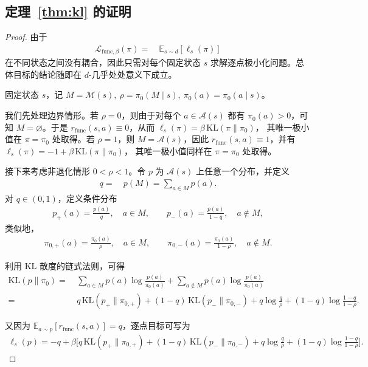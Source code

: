 \subsection{定理~\ref{thm:kl} 的证明}\label{sec:proof-kl-proj}

\begin{proof}
由于
\begin{align*}
\mathcal L_{\mathrm{func},\beta}(\pi)= &~ \mathbb E_{s\sim d}[\ell_s(\pi)]
\end{align*}
在不同状态之间没有耦合，因此只需对每个固定状态 $s$ 求解逐点极小化问题。总体目标的结论随即在 $d$-几乎处处意义下成立。

固定状态 $s$，记 $M= \mathcal M(s), ~\rho= \pi_0(M\mid s), ~\pi_0(a)= \pi_0(a\mid s)$。

我们先处理边界情形。若 $\rho=0$，则由于对每个 $a\in \mathcal{A}(s)$ 都有 $\pi_0(a)>0$，可知 $M=\varnothing$。于是 $r_{\mathrm{func}}(s,a)\equiv 0$，从而 $\ell_s(\pi)= \beta\, \mathrm{KL}(\pi\|\pi_0)$，
其唯一极小值在 $\pi=\pi_0$ 处取得。若 $\rho=1$，则 $M=\mathcal{A}(s)$，因此 $r_{\mathrm{func}}(s,a)\equiv 1$，并有 $\ell_s(\pi)= -1 + \beta\, \mathrm{KL}(\pi\|\pi_0)$，
其唯一极小值同样在 $\pi=\pi_0$ 处取得。

接下来考虑非退化情形 $0<\rho<1$。令 $p$ 为 $\mathcal{A}(s)$ 上任意一个分布，并定义
\begin{align*}
q= &~ p(M)=\sum_{a\in M} p(a).
\end{align*}
对 $q\in(0,1)$，定义条件分布
\begin{align*}
p_+(a)= \frac{p(a)}{q}, \quad a\in M, \qquad
p_-(a)= \frac{p(a)}{1-q}, \quad a\notin M,
\end{align*}
类似地，
\begin{align*}
\pi_{0,+}(a)= \frac{\pi_0(a)}{\rho}, \quad a\in M, \qquad
\pi_{0,-}(a)= \frac{\pi_0(a)}{1-\rho}, \quad a\notin M.
\end{align*}

利用 KL 散度的链式法则，可得
\begin{align*}
\mathrm{KL}(p\|\pi_0)
= &~ \sum_{a\in M} p(a)\log\frac{p(a)}{\pi_0(a)}
   + \sum_{a\notin M} p(a)\log\frac{p(a)}{\pi_0(a)} \\
= &~ q\,\mathrm{KL}(p_+\|\pi_{0,+})
   + (1-q)\,\mathrm{KL}(p_-\|\pi_{0,-}) + q\log\frac{q}{\rho}
   + (1-q)\log\frac{1-q}{1-\rho}.
\end{align*}

又因为 $\mathbb E_{a\sim p}[r_{\mathrm{func}}(s,a)]=q$，逐点目标可写为
\begin{align*}
\ell_s(p)
= -q
+ \beta\Bigg[
q\,\mathrm{KL}(p_+\|\pi_{0,+})
+ (1-q)\,\mathrm{KL}(p_-\|\pi_{0,-})
+ q\log\frac{q}{\rho}
+ (1-q)\log\frac{1-q}{1-\rho}
\Bigg].
\end{align*}


\end{proof}
